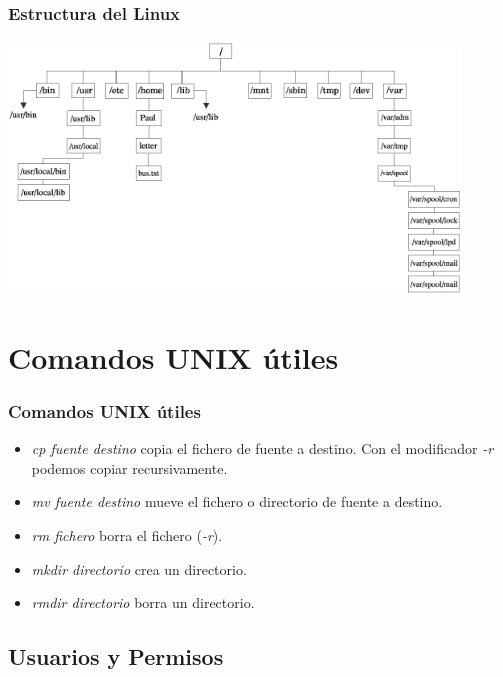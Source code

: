 \documentclass[colorlinks,10pt]{beamer}
\begin{document}
\begin{frame}
  \frametitle{Estructura del Linux}
  \begin{center}
    \includegraphics[width=0.9\textwidth]{figs/filesystem} \\
  \end{center}
\end{frame}


\section{Comandos UNIX útiles}

\begin{frame}
  \frametitle{Comandos UNIX útiles}
  \begin{itemize}
  \item<+-> \emph{cp fuente destino} copia el fichero de fuente a
    destino. Con el  modificador \emph{-r} podemos copiar recursivamente.
  \item<+-> \emph{mv fuente destino } mueve el fichero  o directorio de fuente
    a destino.
  \item<+-> \emph{rm fichero} borra el fichero (\emph{-r}).
    \item<+-> \emph{mkdir directorio} crea un directorio.
    \item<+-> \emph{rmdir directorio} borra un directorio.
  \end{itemize}
\end{frame}






\subsection{Usuarios y Permisos}
\end{document}
